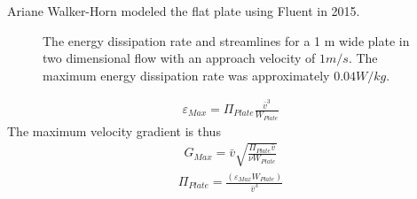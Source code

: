 \documentclass[letterpaper,10pt,english]{sphinxmanual}
\let\sphinxpxdimen\pdfpxdimen\else\newdimen\sphinxpxdimen
\begin{document}
Ariane Walker-Horn modeled the flat plate using Fluent in 2015.

\begin{figure}[htbp]
\centering
\capstart

\noindent\sphinxincludegraphics[width=600\sphinxpxdimen]{{CFD_Flat_Plate}.png}
\caption{The energy dissipation rate and streamlines for a 1 m wide plate in two dimensional flow with an approach velocity of \(1 m/s\). The maximum energy dissipation rate was approximately \(0.04 W/kg\).}\label{\detokenize{Rapid_Mix/RM_Derivations:id8}}\label{\detokenize{Rapid_Mix/RM_Derivations:figure-cfd-flat-plate}}\end{figure}
\begin{equation}\label{equation:Rapid_Mix/RM_Derivations:Rapid_Mix/RM_Derivations:133}
\begin{split}\varepsilon _{Max} = \Pi_{Plate}\frac{\bar v^3}{W_{Plate}}\end{split}
\end{equation}
The maximum velocity gradient is thus
\begin{equation}\label{equation:Rapid_Mix/RM_Derivations:Rapid_Mix/RM_Derivations:134}
\begin{split}G_{Max} = \bar v\sqrt{\frac{\Pi_{Plate} \bar v}{\nu W_{Plate}}}\end{split}
\end{equation}\begin{equation}\label{equation:Rapid_Mix/RM_Derivations:Rapid_Mix/RM_Derivations:135}
\begin{split}\Pi_{Plate} = \frac{ \left( \varepsilon_{Max} W_{Plate} \right)}{\bar v^3}\end{split}
\end{equation}
%
\begin{sphinxVerbatim}[commandchars=\\\{\}]
  
  
  
    
\end{sphinxVerbatim}
\end{document}
